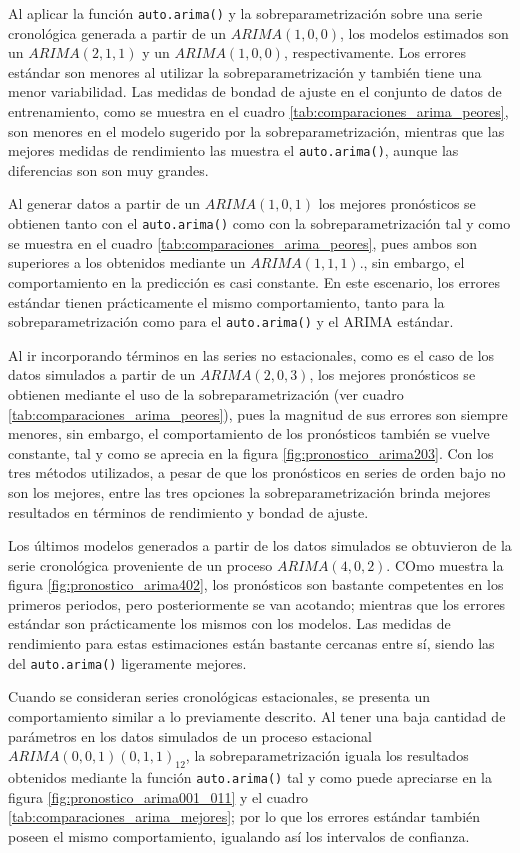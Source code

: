\documentclass[
]{article}
\begin{document}
Al aplicar la función \texttt{auto.arima()} y la sobreparametrización
sobre una serie cronológica generada a partir de un \(ARIMA(1,0,0)\),
los modelos estimados son un \(ARIMA(2,1,1)\) y un \(ARIMA(1,0,0)\),
respectivamente. Los errores estándar son menores al utilizar la
sobreparametrización y también tiene una menor variabilidad. Las medidas
de bondad de ajuste en el conjunto de datos de entrenamiento, como se
muestra en el cuadro \ref{tab:comparaciones_arima_peores}, son menores
en el modelo sugerido por la sobreparametrización, mientras que las
mejores medidas de rendimiento las muestra el \texttt{auto.arima()},
aunque las diferencias son son muy grandes.

Al generar datos a partir de un \(ARIMA(1,0,1)\) los mejores pronósticos
se obtienen tanto con el \texttt{auto.arima()} como con la
sobreparametrización tal y como se muestra en el cuadro
\ref{tab:comparaciones_arima_peores}, pues ambos son superiores a los
obtenidos mediante un \(ARIMA(1,1,1)\)., sin embargo, el comportamiento
en la predicción es casi constante. En este escenario, los errores
estándar tienen prácticamente el mismo comportamiento, tanto para la
sobreparametrización como para el \texttt{auto.arima()} y el ARIMA
estándar.

Al ir incorporando términos en las series no estacionales, como es el
caso de los datos simulados a partir de un \(ARIMA(2,0,3)\), los mejores
pronósticos se obtienen mediante el uso de la sobreparametrización (ver
cuadro \ref{tab:comparaciones_arima_peores}), pues la magnitud de sus
errores son siempre menores, sin embargo, el comportamiento de los
pronósticos también se vuelve constante, tal y como se aprecia en la
figura \ref{fig:pronostico_arima203}. Con los tres métodos utilizados, a
pesar de que los pronósticos en series de orden bajo no son los mejores,
entre las tres opciones la sobreparametrización brinda mejores
resultados en términos de rendimiento y bondad de ajuste.

Los últimos modelos generados a partir de los datos simulados se
obtuvieron de la serie cronológica proveniente de un proceso
\(ARIMA(4,0,2)\). COmo muestra la figura \ref{fig:pronostico_arima402},
los pronósticos son bastante competentes en los primeros periodos, pero
posteriormente se van acotando; mientras que los errores estándar son
prácticamente los mismos con los modelos. Las medidas de rendimiento
para estas estimaciones están bastante cercanas entre sí, siendo las del
\texttt{auto.arima()} ligeramente mejores.

Cuando se consideran series cronológicas estacionales, se presenta un
comportamiento similar a lo previamente descrito. Al tener una baja
cantidad de parámetros en los datos simulados de un proceso estacional
\(ARIMA(0,0,1)(0,1,1)_{12}\), la sobreparametrización iguala los
resultados obtenidos mediante la función \texttt{auto.arima()} tal y
como puede apreciarse en la figura \ref{fig:pronostico_arima001_011} y
el cuadro \ref{tab:comparaciones_arima_mejores}; por lo que los errores
estándar también poseen el mismo comportamiento, igualando así los
intervalos de confianza.
\end{document}
